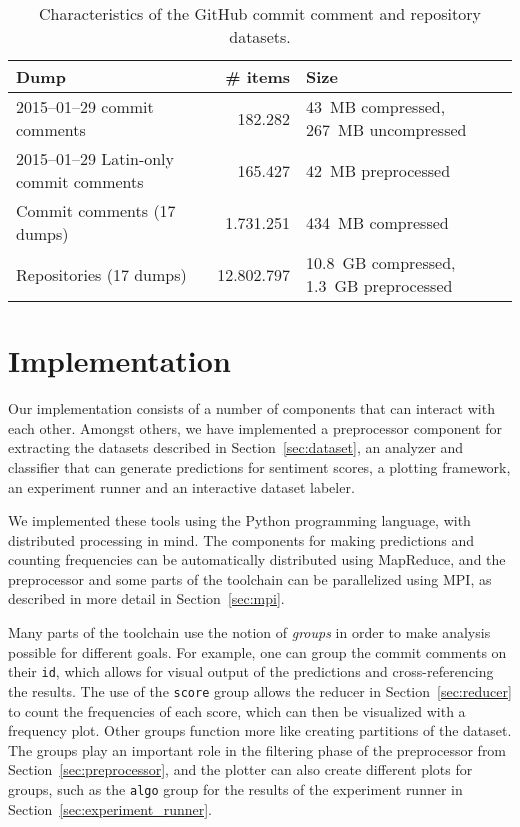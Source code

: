 \documentclass{article}
\begin{document}
\begin{table}[h]
  \centering
  \begin{tabular}{l r l}
    \toprule
    \textbf{Dump}                           & \textbf{\# items} & \textbf{Size}                           \\
    \midrule
    2015--01--29 commit comments            & 182.282           & 43~MB compressed, 267~MB uncompressed   \\
    2015--01--29 Latin-only commit comments & 165.427           & 42~MB preprocessed                      \\
    Commit comments (17 dumps)              & 1.731.251         & 434~MB compressed                       \\
    Repositories (17 dumps)                 & 12.802.797        & 10.8~GB compressed, 1.3~GB preprocessed \\
    \bottomrule
  \end{tabular}
  \caption{Characteristics of the GitHub commit comment and repository datasets.}\label{tab:dataset}
\end{table}

\section{Implementation}\label{sec:implementation}

Our implementation consists of a number of components that can interact with 
each other. Amongst others, we have implemented a preprocessor component for 
extracting the datasets described in Section~\ref{sec:dataset}, an analyzer and 
classifier that can generate predictions for sentiment scores, a plotting 
framework, an experiment runner and an interactive dataset labeler.

We implemented these tools using the Python programming language, with 
distributed processing in mind. The components for making predictions and 
counting frequencies can be automatically distributed using MapReduce, and the 
preprocessor and some parts of the toolchain can be parallelized using MPI, as 
described in more detail in Section~\ref{sec:mpi}.

Many parts of the toolchain use the notion of \emph{groups} in order to make 
analysis possible for different goals. For example, one can group the commit 
comments on their {\tt id}, which allows for visual output of the predictions 
and cross-referencing the results. The use of the {\tt score} group allows the 
reducer in Section~\ref{sec:reducer} to count the frequencies of each score, 
which can then be visualized with a frequency plot. Other groups function more 
like creating partitions of the dataset. The groups play an important role in
the filtering phase of the preprocessor from Section~\ref{sec:preprocessor},
and the plotter can also create different plots for groups, such as the
{\tt algo} group for the results of the experiment runner in
Section~\ref{sec:experiment_runner}.
\end{document}
